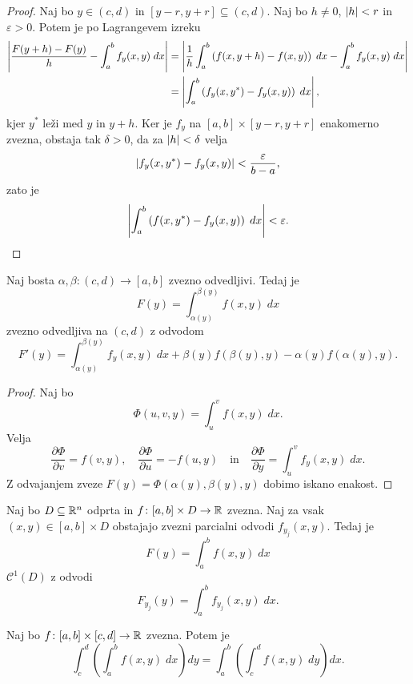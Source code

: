 \begin{proof}
Naj bo $y \in (c,d)$ in $[y-r,y+r] \subseteq (c,d)$. Naj bo
$h \ne 0$, $\left\lvert h\right\rvert < r$ in $\varepsilon > 0$. Potem je po
Lagrangevem izreku
\begin{align*}
\left\lvert \frac{F(y+h) - F(y)}{h} - \int_a^b f_y(x,y)\;dx\right\rvert &=
\left\lvert \frac{1}{h} \int_a^b \left(f(x,y+h) - f(x,y)\right)\;dx -
\int_a^b f_y(x,y)\;dx\right\rvert
\\
&= \left\lvert \int_a^b \left(f_y(x,y^*) - f_y(x,y)\right)\;dx\right\rvert,
\end{align*}
kjer $y^*$ leži med $y$ in $y+h$. Ker je $f_y$ na
$[a,b] \times [y-r,y+r]$ enakomerno zvezna, obstaja tak
$\delta > 0$, da za $\left\lvert h\right\rvert < \delta$ velja
\[
\left\lvert f_y(x,y^*) - f_y(x,y)\right\rvert < \frac{\varepsilon}{b-a},
\]
zato je
\[
\left\lvert \int_a^b \left(f(x,y^*) - f_y(x,y)\right)\;dx\right\rvert < \varepsilon.
\qedhere
\]
\end{proof}

\begin{posledica}
Naj bosta $\alpha,\beta \colon (c,d) \to [a,b]$ zvezno odvedljivi.
Tedaj je
\[
F(y) = \int_{\alpha(y)}^{\beta(y)} f(x,y)\;dx
\]
zvezno odvedljiva na $(c,d)$ z odvodom
\[
F'(y) = \int_{\alpha(y)}^{\beta(y)} f_y(x,y)\;dx +
\beta(y) f(\beta(y),y) - \alpha(y) f(\alpha(y),y).
\]
\end{posledica}

\begin{proof}
Naj bo
\[
\Phi(u,v,y) = \int_u^v f(x,y)\;dx.
\]
Velja
\[
\frac{\partial \Phi}{\partial v} = f(v,y),
\quad
\frac{\partial \Phi}{\partial u} = -f(u,y)
\quad \text{in} \quad
\frac{\partial \Phi}{\partial y} = \int_u^v f_y(x,y)\;dx.
\]
Z odvajanjem zveze $F(y) = \Phi(\alpha(y),\beta(y),y)$ dobimo
iskano enakost.
\end{proof}

\begin{posledica}
Naj bo $D \subseteq \mathbb{R}^n$ odprta in
$f \colon [a,b] \times D \to \mathbb{R}$ zvezna. Naj za vsak
$(x,y) \in [a,b] \times D$ obstajajo zvezni parcialni odvodi
$f_{y_j}(x,y)$. Tedaj je
\[
F(y) = \int_a^b f(x,y)\;dx
\]
$\mathcal{C}^1(D)$ z odvodi
\[
F_{y_j}(y) =  \int_a^b f_{y_j}(x,y)\;dx.
\]
\end{posledica}


\begin{izrek}[Fubini]\label{iz:fub1}
Naj bo $f \colon [a,b] \times [c,d] \to \mathbb{R}$ zvezna. Potem je
\[
\int_c^d \left(\int_a^b f(x,y)\;dx\right) dy =
\int_a^b \left(\int_c^d f(x,y)\;dy\right) dx.
\]
\end{izrek}


